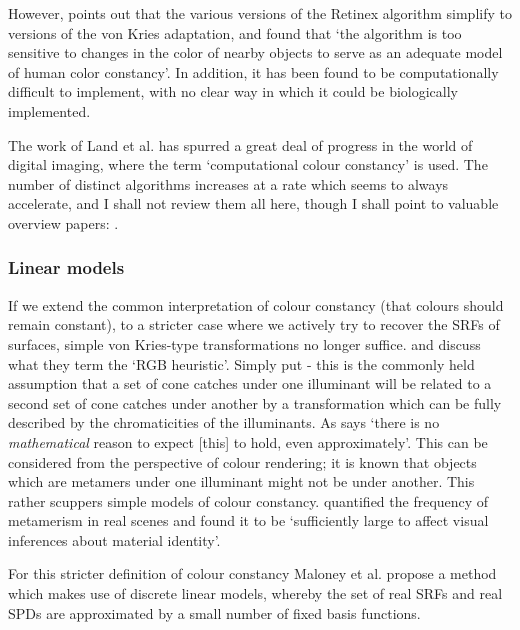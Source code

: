 However, \citet{barnard_practical_1999} points out that the various versions of the Retinex algorithm simplify to versions of the von Kries adaptation, and \citet{brainard_analysis_1986} found that `the algorithm is too sensitive to changes in the color of nearby objects to serve as an adequate model of human color constancy'. In addition, it has been found to be computationally difficult to implement, with no clear way in which it could be biologically implemented.

The work of Land et al. has spurred a great deal of progress in the world of digital imaging, where the term `computational colour constancy' is used. The number of distinct algorithms increases at a rate which seems to always accelerate, and I shall not review them all here, though I shall point to valuable overview papers:  \citet{hordley_reevaluation_2006, gijsenij_computational_2011}.

\subsubsection{Linear models}

If we extend the common interpretation of colour constancy (that colours should remain constant), to a stricter case where we actively try to recover the \glspl{SRF} of surfaces, simple von Kries-type transformations no longer suffice. \citet{maloney_physics-based_2001} and \citet{yang_illuminant_2001} discuss what they term the `RGB heuristic'. Simply put - this is the commonly held assumption that a set of cone catches under one illuminant will be related to a second set of cone catches under another by a transformation which can be fully described by the chromaticities of the illuminants. As \citet{maloney_physics-based_2001} says `there is no \emph{mathematical} reason to expect [this] to hold, even approximately'. This can be considered from the perspective of colour rendering; it is known that objects which are metamers under one illuminant might not be under another. This rather scuppers simple models of colour constancy. \citet{foster_frequency_2006} quantified the frequency of metamerism in real scenes and found it to be `sufficiently large to affect visual inferences about material identity'.

For this stricter definition of colour constancy Maloney et al. \citep{maloney_computational_1984, maloney_color_1986} propose a method which makes use of discrete linear models, whereby the set of real \glspl{SRF} and real \glspl{SPD} are approximated by a small number of fixed basis functions. 

